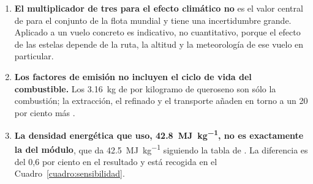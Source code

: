 \documentclass[11pt,letterpaper]{article}
\begin{document}
\begin{enumerate}
{  catálogo} \parencite{learjet75,aopalearjet}, que corresponden a un alcance con
  cuatro pasajeros y reservas incluidas, y por tanto no son estrictamente
  homogéneas con mi cálculo de crucero puro. El factor 1,6 de la comprobación 4
  es un orden de magnitud, no una medida.
\item \textbf{El multiplicador de tres para el efecto climático no } es
  el valor central de \textcite{lee2021} para el conjunto de la flota mundial y
  tiene una incertidumbre grande. Aplicado a un vuelo concreto es indicativo, no
  cuantitativo, porque el efecto de las estelas depende de la ruta, la altitud
  y la meteorología de ese vuelo en particular.
\item \textbf{Los factores de emisión no incluyen el ciclo de vida del
  combustible.} Los \SI{3.16}{\kilogram} de  por kilogramo de queroseno
  son sólo la combustión; la extracción, el refinado y el transporte añaden en
  torno a un 20 por ciento más \parencite{defra2025}.
\item \textbf{La densidad energética que uso, \SI{42.8}{\mega\joule\per\kilogram},
  no es exactamente la del módulo}, que da \SI{42.5}{\mega\joule\per\kilogram}
  siguiendo la tabla de \textcite{tennekes2009}. La diferencia es del 0,6 por
  ciento en el resultado y está recogida en el
  Cuadro~\ref{cuadro:sensibilidad}.
\end{enumerate}

\printbibliography
\end{document}
